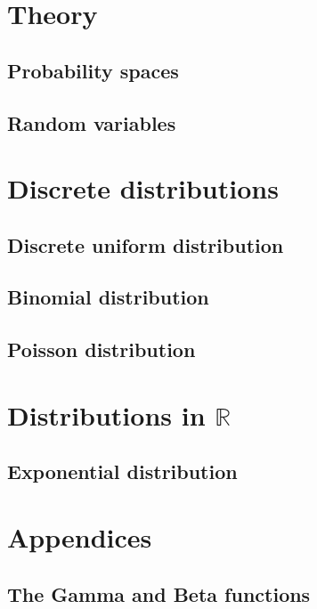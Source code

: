 \documentclass[12pt]{book}
\theoremstyle{plain}
\theoremstyle{definition}
\theoremstyle{remark}
\newcommand{\R}{\mathbb{R}} %
\begin{document}
	\tableofcontents
	
	\part{Theory}

	\chapter{Probability spaces}
	
	
	\chapter{Random variables}
	
	
	\part{Discrete distributions}

	\chapter{Discrete uniform distribution}
	
	
	\chapter{Binomial distribution}
	

	\chapter{Poisson distribution}
	

	\part{Distributions in \texorpdfstring{$\R$}{R}}

	\chapter{Exponential distribution}
	

	\part{Appendices}

	\appendix
	\chapter{The Gamma and Beta functions}
	
	
	\printbibliography
\end{document}
